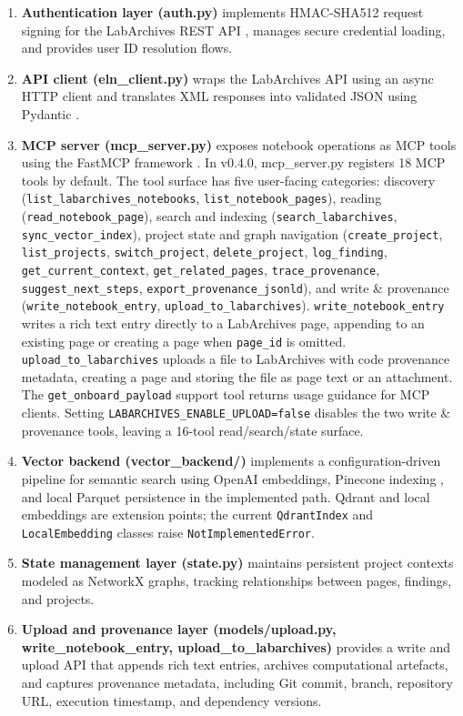 \documentclass{josr}
\begin{document}
\begin{enumerate}
    \item \textbf{Authentication layer (auth.py)} implements HMAC-SHA512 request signing for the LabArchives REST API \cite{labarchives}, manages secure credential loading, and provides user ID resolution flows.
    \item \textbf{API client (eln\_client.py)} wraps the LabArchives API using an async HTTP client and translates XML responses into validated JSON using Pydantic \cite{pydantic}.
    \item \textbf{MCP server (mcp\_server.py)} exposes notebook operations as MCP tools using the FastMCP framework \cite{fastmcp}. In v0.4.0, mcp\_server.py registers 18 MCP tools by default. The tool surface has five user-facing categories: discovery (\texttt{list\_labarchives\_notebooks}, \texttt{list\_notebook\_pages}), reading (\texttt{read\_notebook\_page}), search and indexing (\texttt{search\_labarchives}, \texttt{sync\_vector\_index}), project state and graph navigation (\texttt{create\_project}, \texttt{list\_projects}, \texttt{switch\_project}, \texttt{delete\_project}, \texttt{log\_finding}, \texttt{get\_current\_context}, \texttt{get\_related\_pages}, \texttt{trace\_provenance}, \texttt{suggest\_next\_steps}, \texttt{export\_provenance\_jsonld}), and write \& provenance (\texttt{write\_notebook\_entry}, \texttt{upload\_to\_labarchives}). \texttt{write\_notebook\_entry} writes a rich text entry directly to a LabArchives page, appending to an existing page or creating a page when \texttt{page\_id} is omitted. \texttt{upload\_to\_labarchives} uploads a file to LabArchives with code provenance metadata, creating a page and storing the file as page text or an attachment. The \texttt{get\_onboard\_payload} support tool returns usage guidance for MCP clients. Setting \texttt{LABARCHIVES\_ENABLE\_UPLOAD=false} disables the two write \& provenance tools, leaving a 16-tool read/search/state surface.
    \item \textbf{Vector backend (vector\_backend/)} implements a configuration-driven pipeline for semantic search using OpenAI embeddings, Pinecone indexing \cite{pinecone}, and local Parquet persistence in the implemented path. Qdrant \cite{qdrant} and local embeddings are extension points; the current \texttt{QdrantIndex} and \texttt{LocalEmbedding} classes raise \texttt{NotImplementedError}.
    \item \textbf{State management layer (state.py)} maintains persistent project contexts modeled as NetworkX graphs, tracking relationships between pages, findings, and projects.
    \item \textbf{Upload and provenance layer (models/upload.py, write\_notebook\_entry, upload\_to\_labarchives)} provides a write and upload API that appends rich text entries, archives computational artefacts, and captures provenance metadata, including Git commit, branch, repository URL, execution timestamp, and dependency versions.
\end{enumerate}
\end{document}
